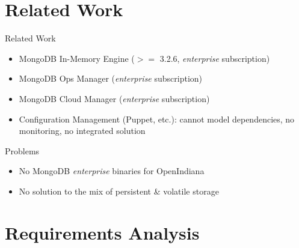 \documentclass[11pt,aspectratio=169]{beamer}
\begin{document}
    \section{Related Work}
    
    \begin{frame}{Related Work}
        
        \begin{itemize}
            \item MongoDB In-Memory Engine ($>=$ 3.2.6, \textit{enterprise} subscription)
            \item MongoDB Ops Manager (\textit{enterprise} subscription)
            \item MongoDB Cloud Manager (\textit{enterprise} subscription)
            \item Configuration Management (Puppet, etc.): cannot model dependencies, no monitoring, no integrated solution
        \end{itemize}
        
        Problems
        
        \begin{itemize}
            \item No MongoDB \textit{enterprise} binaries for OpenIndiana
            \item No solution to the mix of persistent \& volatile storage 
        \end{itemize}
        
    \end{frame}
    
    
    \section{Requirements Analysis}
   
\end{document}
